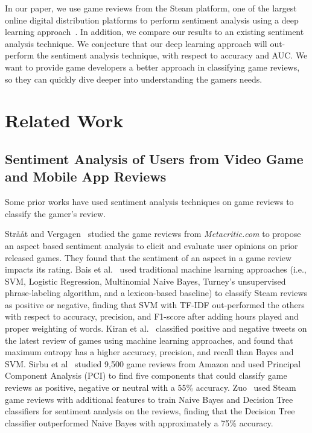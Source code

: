 \documentclass[conference]{IEEEtran}
\begin{document}
In our paper, we use game reviews from the Steam platform, one of the largest online digital distribution platforms to perform sentiment analysis using a deep learning approach~\cite{lin2019empirical}. In addition, we compare our results to an existing sentiment analysis technique. We conjecture that our deep learning approach will out-perform the sentiment analysis technique, with respect to accuracy and AUC. We want to provide game developers a better approach in classifying game reviews, so they can quickly dive deeper into understanding the gamers needs.
%


\section{Related Work}
\label{sec:relatedwork}

\subsection{Sentiment Analysis of Users from Video Game and Mobile App Reviews}


Some prior works have used sentiment analysis techniques on game reviews to classify the gamer's review.


 Str{\aa}{\aa}t and Vergagen~\cite{straaaat2017using} studied the game reviews from \textit{Metacritic.com} to propose an aspect based sentiment analysis to elicit and evaluate user opinions on prior released games. They found that the sentiment of an aspect in a game review impacts its rating. Bais et al.~\cite{baissentiment} used traditional machine learning approaches (i.e., SVM, Logistic Regression, Multinomial Naive Bayes, Turney's unsupervised phrase-labeling algorithm, and a lexicon-based baseline) to classify Steam reviews as positive or negative, finding that SVM with TF-IDF out-performed the others with respect to accuracy, precision, and F1-score after adding hours played and proper weighting of words. Kiran et al.~\cite{kirantwitter} classified positive and negative tweets on the latest review of games using machine learning approaches, and found that maximum entropy has a higher accuracy, precision, and recall than Bayes and SVM. Sirbu et al~\cite{sirbu2016extracting} studied 9,500 game reviews from Amazon and used Principal Component Analysis (PCI) to find five components that could classify game reviews as positive, negative or neutral with a 55\% accuracy. Zuo~\cite{zuo2018sentiment} used Steam game reviews with additional features to train Naive Bayes and Decision Tree classifiers for sentiment analysis on the reviews, finding that the Decision Tree classifier outperformed Naive Bayes with approximately a 75\% accuracy.
\end{document}
